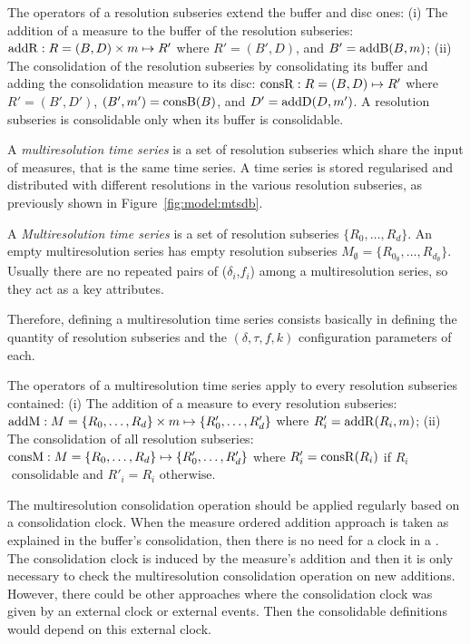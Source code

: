 The operators of a resolution subseries extend the buffer and disc
ones: (i) The addition of a measure to the buffer of the resolution
subseries: $\operatorname{addR} : R=(B,D) \times m \mapsto R'$ where $R'= (B',D)$,
and $B'= \operatorname{addB}(B,m)$; (ii) The consolidation of the resolution
subseries by consolidating its buffer and adding the consolidation
measure to its disc: $\operatorname{consR} : R=(B,D) \mapsto R'$ where $R'=
(B',D')$, $(B',m') = \operatorname{consB}(B)$, and $D'= \operatorname{addD}(D,m')$.  A resolution
subseries is consolidable only when its buffer is consolidable.




A \emph{multiresolution time series} is a set of resolution subseries
which share the input of measures, that is the same time series. A
time series is stored regularised and distributed with different
resolutions in the various resolution subseries, as previously shown
in Figure~\ref{fig:model:mtsdb}.
\begin{definition}%
  A \emph{Mul\-ti\-re\-solution time series} is a set of resolution
  subseries $\{R_0, \dots, R_d\}$.  An empty multiresolution series
  has empty resolution subseries $M_{\emptyset}=\{R_{0_\emptyset},
  \dots, R_{d_\emptyset}\}$. Usually there are no repeated pairs of
  ($\delta_i$,$f_i$) among a multiresolution series, so they act as a
  key attributes.
\end{definition}

Therefore, defining a multiresolution time series consists basically
in defining the quantity of resolution subseries and the
$(\delta,\tau,f,k)$ configuration parameters of each.


The operators of a multiresolution time series apply to every
resolution subseries contained: (i) The addition of a measure to every
resolution subseries: $\operatorname{addM} : M=\{R_0,\allowbreak \dots,\allowbreak
R_d\} \times m \mapsto \{R'_0, \dots,\allowbreak R'_d\}$ where
$R'_i=\operatorname{addR}(R_i,m)$; (ii) The consolidation of all resolution
subseries: $\operatorname{consM} : M=\{R_0,\allowbreak \dots,\allowbreak R_d\}
\mapsto \{R'_0,\allowbreak \dots,\allowbreak R'_d\}$ where $R'_i =
\operatorname{consR}(R_i)$ if $R_i$ $\text{ consolidable}$ and $R'_i=R_i$
$\text{otherwise}$.


The multiresolution consolidation operation should be applied
regularly based on a consolidation clock. When the measure ordered
addition approach is taken as explained in the buffer's consolidation,
then there is no need for a clock in a . The consolidation clock
is induced by the measure's addition and then it is only necessary to
check the multiresolution consolidation operation on new
additions. However, there could be other approaches where the
consolidation clock was given by an external clock or external
events. Then the consolidable definitions would depend on this
external clock.


